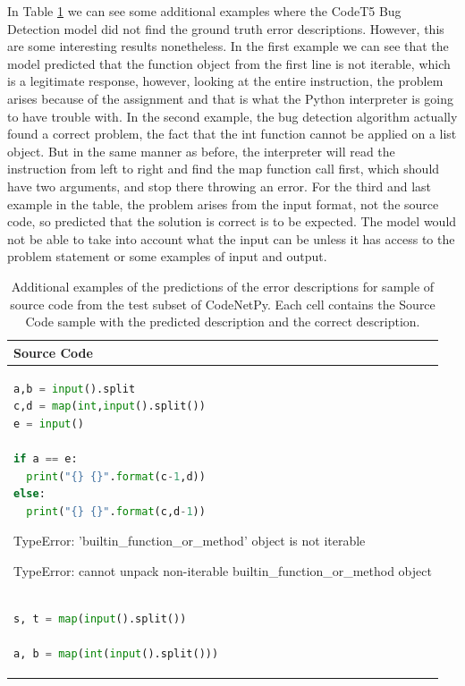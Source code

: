 \documentclass[12pt,a4paper]{report}
\begin{document}
\begin{appendices}
In Table \ref{tab:appendices1} we can see some additional examples where the CodeT5 Bug Detection model did not find the ground truth error descriptions. However, this are some interesting results nonetheless. In the first example we can see that the model predicted that the function object from the first line is not iterable, which is a legitimate response, however, looking at the entire instruction, the problem arises because of the assignment and that is what the Python interpreter is going to have trouble with. In the second example, the bug detection algorithm actually found a correct problem, the fact that the int function cannot be applied on a list object. But in the same manner as before, the interpreter will read the instruction from left to right and find the map function call first, which should have two arguments, and stop there throwing an error. For the third and last example in the table, the problem arises from the input format, not the source code, so predicted that the solution is correct is to be expected. The model would not be able to take into account what the input can be unless it has access to the problem statement or some examples of input and output.

\begin{table}[H]\small\linespread{1}
\centering
\caption{Additional examples of the predictions of the error descriptions for sample of source code from the test subset of CodeNetPy. Each cell contains the Source Code sample with the predicted description and the correct description.}
\label{tab:appendices1}
\begin{tabular}{p{15cm}}
\textbf{Source Code} \\
\hline
\begin{lstlisting}[language=Python]
a,b = input().split
c,d = map(int,input().split())
e = input()

if a == e:
  print("{} {}".format(c-1,d))
else:
  print("{} {}".format(c,d-1))
\end{lstlisting}

TypeError: 'builtin\_function\_or\_method' object is not iterable

TypeError: cannot unpack non-iterable builtin\_function\_or\_method object

\\

\hline
\begin{lstlisting}[language=Python]
s, t = map(input().split())

a, b = map(int(input().split()))


\end{lstlisting}
\end{tabular}
\end{table}
\end{appendices}
\end{document}
